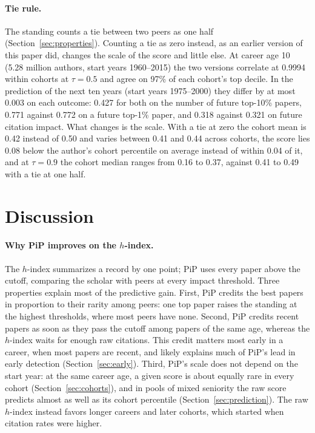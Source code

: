 \documentclass[11pt]{article}
\begin{document}
\paragraph{Tie rule.} The standing counts a tie between two peers as one half (Section~\ref{sec:properties}). Counting
a tie as zero instead, as an earlier version of this paper did, changes the scale of the score and little else. At
career age 10 (5.28 million authors, start years 1960--2015) the two versions correlate at 0.9994 within cohorts at
$\tau = 0.5$ and agree on 97\% of each cohort's top decile. In the prediction of the next ten years (start years
1975--2000) they differ by at most 0.003 on each outcome: 0.427 for both on the number of future top-10\% papers, 0.771
against 0.772 on a future top-1\% paper, and 0.318 against 0.321 on future citation impact. What changes is the scale.
With a tie at zero the cohort mean is 0.42 instead of 0.50 and varies between 0.41 and 0.44 across cohorts, the score
lies 0.08 below the author's cohort percentile on average instead of within 0.04 of it, and at $\tau = 0.9$ the cohort
median ranges from 0.16 to 0.37, against 0.41 to 0.49 with a tie at one half.

\section{Discussion}
\label{sec:discussion}

\paragraph{Why PiP improves on the $h$-index.} The $h$-index summarizes a record by one point; PiP uses every paper
above the cutoff, comparing the scholar with peers at every impact threshold. Three properties explain most of the
predictive gain. First, PiP credits the best papers in proportion to their rarity among peers: one top paper raises the
standing at the highest thresholds, where most peers have none. Second, PiP credits recent papers as soon as they pass
the cutoff among papers of the same age, whereas the $h$-index waits for enough raw citations. This credit matters most
early in a career, when most papers are recent, and likely explains much of PiP's lead in early detection
(Section~\ref{sec:early}). Third, PiP's scale does not depend on the start year: at the same career age, a given score
is about equally rare in every cohort (Section~\ref{sec:cohorts}), and in pools of mixed seniority the raw score
predicts almost as well as its cohort percentile (Section~\ref{sec:prediction}). The raw $h$-index instead favors longer
careers and later cohorts, which started when citation rates were higher.
\end{document}

